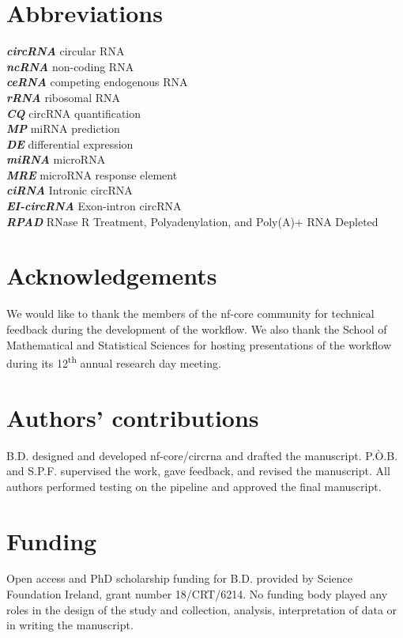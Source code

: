 \documentclass{bmcart}
\begin{document}
\begin{backmatter}

\section*{Abbreviations}
\textbf{\textit{circRNA}} circular RNA \\ \textbf{\textit{ncRNA}} non-coding RNA \\ \textbf{\textit{ceRNA}} competing endogenous RNA \\ \textbf{\textit{rRNA}} ribosomal RNA \\ \textbf{\textit{CQ}} circRNA quantification\\ \textbf{\textit{MP}} miRNA prediction\\ \textbf{\textit{DE}} differential expression\\ \textbf{\textit{miRNA}} microRNA \\ \textbf{\textit{MRE}} microRNA response element \\ \textbf{\textit{ciRNA}} Intronic circRNA \\ \textbf{\textit{EI-circRNA}} Exon-intron circRNA \\ \textbf{\textit{RPAD}} RNase R Treatment, Polyadenylation, and Poly(A)$+$ RNA Depleted 

\section*{Acknowledgements}%
We would like to thank the members of the nf-core community for  technical feedback during the development of the workflow. We also thank the School of Mathematical and Statistical Sciences for hosting presentations of the workflow during its 12\textsuperscript{th} annual research day meeting.

\section*{Authors' contributions}
B.D. designed and developed nf-core/circrna and drafted the manuscript. P.\`O.B. and S.P.F. supervised the work, gave feedback, and revised the manuscript. All authors performed testing on the pipeline and approved the final manuscript.

\section*{Funding}%
Open access and PhD scholarship funding for B.D. provided by Science Foundation Ireland, grant number 18/CRT/6214. No funding body played any roles in the design of the study and collection, analysis, interpretation of data or in writing the manuscript.


\end{backmatter}
\end{document}
